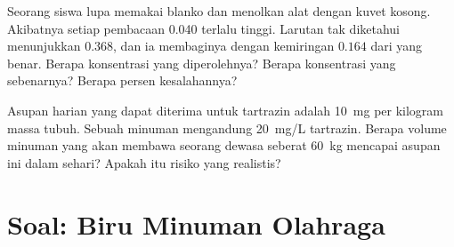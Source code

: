 \begin{exercise}[$\star\star\star$]\label{exo:g11:absorbance:14}
Seorang siswa lupa memakai blanko dan menolkan alat dengan kuvet
kosong. Akibatnya setiap pembacaan \num{0.040} terlalu tinggi. Larutan
tak diketahui menunjukkan $0.368$, dan ia membaginya dengan kemiringan
$0.164$ dari  yang benar. Berapa konsentrasi yang
diperolehnya? Berapa konsentrasi yang sebenarnya? Berapa persen
kesalahannya?
\end{exercise}

\begin{exercise}[$\star\star\star$]\label{exo:g11:absorbance:15}
Asupan harian yang dapat diterima untuk tartrazin adalah \qty{10}{mg}
per kilogram massa tubuh. Sebuah minuman mengandung \qty{20}{mg/L}
tartrazin. Berapa volume minuman yang akan membawa seorang dewasa
seberat \qty{60}{kg} mencapai asupan ini dalam sehari? Apakah itu risiko
yang realistis?
\end{exercise}

\section{Soal: Biru Minuman Olahraga}


